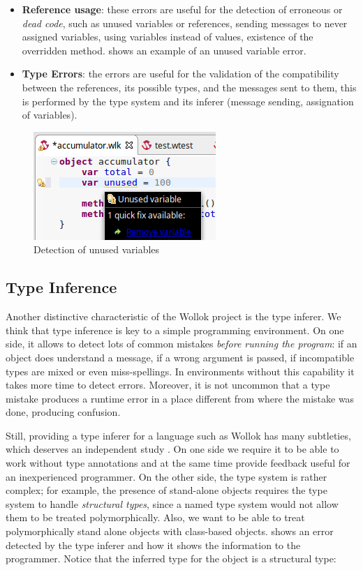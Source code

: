 \begin{itemize}
  \item \textbf{Reference usage}: 
		these errors are useful for the detection of erroneous or \textit{dead code}, such as unused variables or references, 
		sending messages to never assigned variables, using variables instead of values, existence of the overridden method.
		 shows an example of an unused variable error.

  \item \textbf{Type Errors}: the errors are useful for the validation of the compatibility between the references, its possible types, and the messages sent to them, this is performed by the type system and its inferer (\eg message sending, assignation of variables).
\end{itemize}

\begin{figure}[ht]
    \centering
	\includegraphics[scale=0.5]{images/wollok-paper-check-unusedVariable.png}
    \caption{Detection of unused variables}
    \label{fig:check-unusedVariable.png}
\end{figure}

\subsection{Type Inference}
Another distinctive characteristic of the Wollok project is the type inferer.
We think that type inference is key to a simple programming environment.
On one side, it allows to detect lots of common mistakes \emph{before running the program}:
if an object does understand a message, if a wrong argument is passed, if incompatible types are mixed or even miss-spellings.
In environments without this capability it takes more time to detect errors.
Moreover, it is not uncommon that a type mistake produces a runtime error in a place different from where the mistake was done, producing confusion.

Still, providing a type inferer for a language such as Wollok has many subtleties, which deserves an independent study \cite{passerini_nicolas_extensible_2014}.
On one side we require it to be able to work without type annotations and at the same time provide feedback useful for an inexperienced programmer.
On the other side, the type system is rather complex;
for example, the presence of stand-alone objects requires the type system to handle \emph{structural types}, since a named type system would not allow them to be treated polymorphically.
Also, we want to be able to treat polymorphically stand alone objects with class-based objects.
 shows an error detected by the type inferer and how it shows the information to the programmer.
Notice that the inferred type for the object  is a structural type: 


